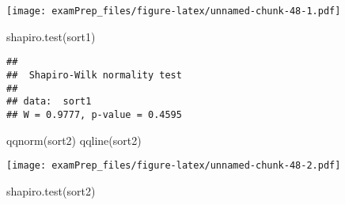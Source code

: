\documentclass[
]{article}
\newenvironment{Shaded}{\begin{snugshade}}{\end{snugshade}}
\newcommand{\CommentTok}[1]{\textcolor[rgb]{0.56,0.35,0.01}{\textit{#1}}}
\newcommand{\FunctionTok}[1]{\textcolor[rgb]{0.00,0.00,0.00}{#1}}
\newcommand{\NormalTok}[1]{#1}
\newcommand{\OtherTok}[1]{\textcolor[rgb]{0.56,0.35,0.01}{#1}}
\newcommand{\SpecialCharTok}[1]{\textcolor[rgb]{0.00,0.00,0.00}{#1}}
\newcommand{\StringTok}[1]{\textcolor[rgb]{0.31,0.60,0.02}{#1}}
\begin{document}
\begin{Shaded}
\end{Shaded}

\texttt{[image: examPrep\_files/figure-latex/unnamed-chunk-48-1.pdf]}

\begin{Shaded}
\begin{Highlighting}[]
\FunctionTok{shapiro.test}\NormalTok{(sort1)}
\end{Highlighting}
\end{Shaded}

\begin{verbatim}
## 
##  Shapiro-Wilk normality test
## 
## data:  sort1
## W = 0.9777, p-value = 0.4595
\end{verbatim}

\begin{Shaded}
\begin{Highlighting}[]
\FunctionTok{qqnorm}\NormalTok{(sort2)}
\FunctionTok{qqline}\NormalTok{(sort2)}
\end{Highlighting}
\end{Shaded}

\texttt{[image: examPrep\_files/figure-latex/unnamed-chunk-48-2.pdf]}

\begin{Shaded}
\begin{Highlighting}[]
\FunctionTok{shapiro.test}\NormalTok{(sort2)}
\end{Highlighting}
\end{Shaded}
\end{document}
